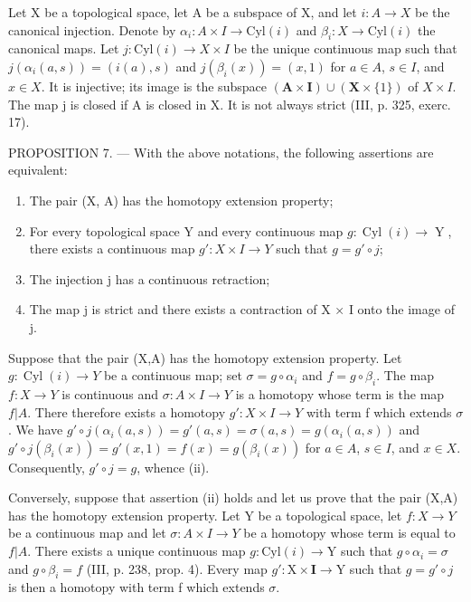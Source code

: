 Let X be a topological space, let A be a subspace of X, and let \(i: A \to X\) be the canonical injection. Denote by \(\alpha_{i}: A \times I \to \text{Cyl}(i)\) and \(\beta_{i}: X \to \text{Cyl}(i)\) the canonical maps. Let \(j: \text{Cyl}(i) \to X \times I\) be the unique continuous map such that \(j(\alpha_{i}(a, s)) = (i(a), s)\) and \(j(\beta_{i}(x)) = (x, 1)\) for \(a \in A\), \(s \in I\), and \(x \in X\). It is injective; its image is the subspace \((\mathbf{A} \times \mathbf{I}) \cup (\mathbf{X} \times \{1\})\) of \(X \times I\). The map j is closed if A is closed in X. It is not always strict (III, p. 325, exerc. 17).

PROPOSITION 7. --- With the above notations, the following assertions are equivalent:

\begin{enumerate}
\def\labelenumi{(\roman{enumi})}
\item
  The pair (X, A) has the homotopy extension property;
\item
  For every topological space Y and every continuous map \(g\colon \operatorname{Cyl}(i) \to \operatorname{Y}\), there exists a continuous map \(g'\colon X \times I \to Y\) such that \(g = g' \circ j\);
\item
  The injection j has a continuous retraction;
\item
  The map j is strict and there exists a contraction of X × I onto the image of j.
\end{enumerate}

Suppose that the pair (X,A) has the homotopy extension property. Let \(g:\operatorname{Cyl}(i)\to Y\) be a continuous map; set \(\sigma=g\circ\alpha_i\) and \(f=g\circ\beta_i\). The map \(f:X\to Y\) is continuous and \(\sigma:A\times I\to Y\) is a homotopy whose term is the map \(f|A\). There therefore exists a homotopy \(g':X\times I\to Y\) with term f which extends \(\sigma\). We have \(g'\circ j(\alpha_i(a,s))=g'(a,s)=\sigma(a,s)=g(\alpha_i(a,s))\) and \(g'\circ j(\beta_i(x))=g'(x,1)=f(x)=g(\beta_i(x))\) for \(a\in A\), \(s\in I\), and \(x\in X\). Consequently, \(g'\circ j=g\), whence (ii).

Conversely, suppose that assertion (ii) holds and let us prove that the pair (X,A) has the homotopy extension property. Let Y be a topological space, let \(f:X\to Y\) be a continuous map and let \(\sigma:A\times I\to Y\) be a homotopy whose term is equal to \(f|A\). There exists a unique continuous map \(g:\mathrm{Cyl}(i)\to\mathrm{Y}\) such that \(g\circ\alpha_i=\sigma\) and \(g\circ\beta_i=f\) (III, p. 238, prop. 4). Every map \(g':\mathrm{X}\times\mathbf{I}\to\mathrm{Y}\) such that \(g=g'\circ j\) is then a homotopy with term f which extends \(\sigma\).

